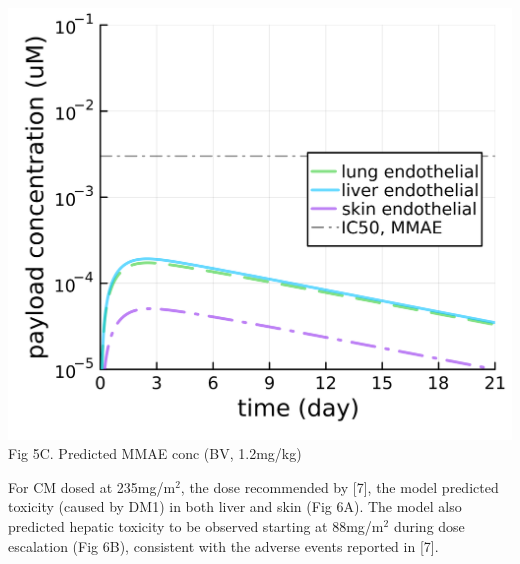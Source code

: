 \documentclass[portrait,fontscale=0.3,paperwidth=36in,paperheight=48in]{baposter}
\begin{document}
\begin{poster}
{\begin{minipage}[c]{0.32\linewidth}
\includegraphics[width= 0.8 \textwidth]{../img/tissue-payload-bv-1.2mg.png} \\
\scriptsize{Fig 5C. Predicted MMAE conc (BV, 1.2mg/kg)}
\end{minipage}


\begin{minipage}[c]{0.48\linewidth}

For CM dosed at 235mg/m$^2$, the dose recommended by [7], the model predicted toxicity (caused by DM1) in both liver and skin (Fig 6A). 
The model also predicted hepatic toxicity to be observed starting at 88mg/m$^2$ during dose escalation (Fig 6B), consistent with the adverse events reported in [7]. 


\end{minipage}}
\end{poster}
\end{document}
